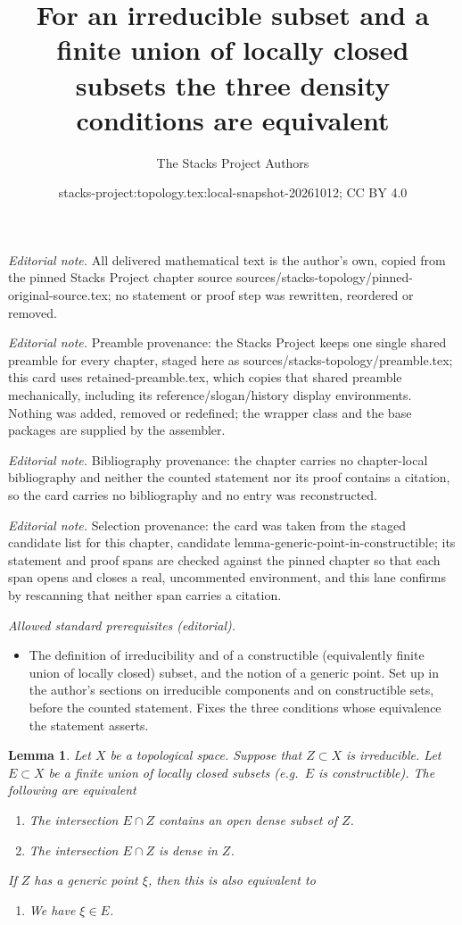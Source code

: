 \documentclass[10pt,a4paper]{amsart}
\title{For an irreducible subset and a finite union of locally closed subsets the three density conditions are equivalent}
\author{The Stacks Project Authors}
\date{stacks-project:topology.tex:local-snapshot-20261012; CC BY 4.0}
\theoremstyle{plain}
\newtheorem{lemma}[subsection]{Lemma}
\theoremstyle{definition}
\theoremstyle{remark}
\numberwithin{equation}{subsection}
\begin{document}
\maketitle
\noindent\textit{Editorial note.} All delivered mathematical text is the author's own, copied from the pinned Stacks Project chapter source sources/stacks-topology/pinned-original-source.tex; no statement or proof step was rewritten, reordered or removed.\par\medskip
\noindent\textit{Editorial note.} Preamble provenance: the Stacks Project keeps one single shared preamble for every chapter, staged here as sources/stacks-topology/preamble.tex; this card uses retained-preamble.tex, which copies that shared preamble mechanically, including its reference/slogan/history display environments. Nothing was added, removed or redefined; the wrapper class and the base packages are supplied by the assembler.\par\medskip
\noindent\textit{Editorial note.} Bibliography provenance: the chapter carries no chapter-local bibliography and neither the counted statement nor its proof contains a citation, so the card carries no bibliography and no entry was reconstructed.\par\medskip
\noindent\textit{Editorial note.} Selection provenance: the card was taken from the staged candidate list for this chapter, candidate lemma-generic-point-in-constructible; its statement and proof spans are checked against the pinned chapter so that each span opens and closes a real, uncommented environment, and this lane confirms by rescanning that neither span carries a citation.\par\medskip
\noindent\textit{Allowed standard prerequisites (editorial).}\begin{itemize}
\item The definition of irreducibility and of a constructible (equivalently finite union of locally closed) subset, and the notion of a generic point. Set up in the author's sections on irreducible components and on constructible sets, before the counted statement. Fixes the three conditions whose equivalence the statement asserts.
\end{itemize}\medskip
\begin{lemma}
\label{lemma-generic-point-in-constructible}
Let $X$ be a topological space. Suppose that
$Z \subset X$ is irreducible. Let $E \subset X$
be a finite union of locally closed subsets (e.g.\ $E$
is constructible). The following are equivalent
\begin{enumerate}
\item The intersection $E \cap Z$ contains an open
dense subset of $Z$.
\item The intersection $E \cap Z$ is dense in $Z$.
\end{enumerate}
If $Z$ has a generic point $\xi$, then this is
also equivalent to
\begin{enumerate}
\item[(3)] We have $\xi \in E$.
\end{enumerate}
\end{lemma}
\end{document}
